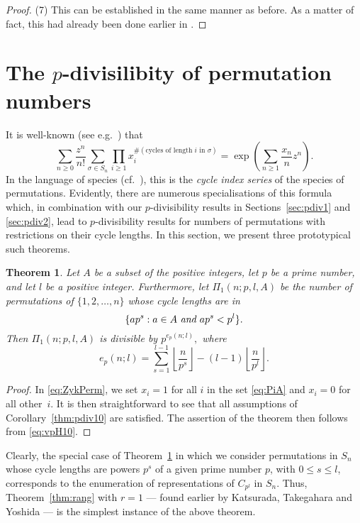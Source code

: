 \documentclass[12pt,reqno]{amsart}
\numberwithin{equation}{section}
\newtheorem{theorem}{Theorem}
\theoremstyle{remark}
\begin{document}
\begin{proof}
\medskip
(7) This can be established in the same manner as before.
As a matter of fact, this had already been done earlier in
\cite{GrNeAA}.
\end{proof}

\section{The $p$-divisilibity of permutation numbers}
\label{sec:perm}

It is well-known (see e.g.\ \cite[Eq.~(5.30)]{StanBI}) that
\begin{equation} \label{eq:ZykPerm} 
\sum_{n\ge0}\frac {z^n} {n!}
\sum_{{\sigma}\in S_n}
\prod _{i\ge1} ^{}x_i^{\#(\text{cycles of length $i$ in ${\sigma}$})}
=
\exp\left(\sum_{n\ge1}\frac {x_n} {n}z^n\right).
\end{equation}
In the language of species (cf.\ \cite{BLL}), this is the
{\it cycle index series} of the species of permutations.
Evidently, there are numerous specialisations of this formula
which, in combination with our $p$-divisibility results in
Sections~\ref{sec:pdiv1} and \ref{sec:pdiv2}, lead to
$p$-divisibility results for numbers of permutations with
restrictions on their cycle lengths. In this section, we present 
three prototypical such theorems.

\begin{theorem} \label{thm:perm1}
Let\/ $A$ be a subset of the positive integers, 
let $p$ be a prime number, and let $l$ be
a positive integer.
Furthermore, let $\Pi_1(n;p,l,A)$ be the number of permutations
of $\{1,2,\dots,n\}$
whose cycle lengths are in 
\begin{equation} \label{eq:PiA} 
\{ap^s:a\in A\text{ \em and }ap^s<p^l\}.
\end{equation}
Then $\Pi_1(n;p,l,A)$ is divisible by $p^{e_p(n;l)},$ where
$$
e_p(n;l)=\sum_{s=1}^{l-1}{\left\lfloor{\frac {n} {p^{s}}}\right\rfloor}-(l-1){\left\lfloor{\frac {n} {p^l}}\right\rfloor}.
$$
\end{theorem}

\begin{proof}
In \eqref{eq:ZykPerm},
we set $x_i=1$ for all $i$ in the set \eqref{eq:PiA} and
$x_i=0$ for all other~$i$.
It is then straightforward to see that
all assumptions of Corollary~\ref{thm:pdiv10} are satisfied.
The assertion of the theorem then follows from \eqref{eq:vpH10}.
\end{proof}

Clearly, the special case of Theorem~\ref{thm:perm1} 
in which we consider permutations in $S_n$ 
whose cycle lengths are powers $p^s$ of
a given prime number $p$, with $0\le s\le l$, corresponds to the
enumeration of representations of $C_{p^l}$ in $S_n$. 
Thus, Theorem~\ref{thm:rang} with $r=1$ --- found earlier by
Katsurada, Takegahara and Yoshida \cite[Theorems~1.2]{KaTYAA} ---
is the simplest instance of the above theorem.
\end{document}
